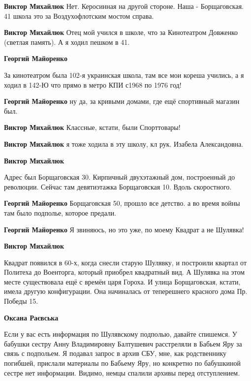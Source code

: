 \begin{itemize}
\begin{itemize}
\begin{itemize}
\textbf{Виктор Михайлюк} Нет. Керосинная на другой стороне. Наша - Борщаговская. 41 школа это за Воздухофлотским мостом справа.

\textbf{Виктор Михайлюк} Отец мой учился в школе, что за Кинотеатром Довженко (светлая память). А я ходил пешком в 41.

\textbf{Георгий Майоренко} 

За кинотеатром была 102-я украинская школа, там все мои кореша учились, а я ходил
в 142-Ю что прямо в метро КПИ с1968 по 1976 год!


\textbf{Георгий Майоренко} ну да, за кривыми домами, где ещё спортивный магазин был.

\textbf{Виктор Михайлюк} Классные, кстати, были Спорттовары!

\textbf{Виктор Михайлюк} я тоже ходила в эту школу, кл рук. Изабела Александовна.
\end{itemize} %

\textbf{Виктор Михайлюк} 

Адрес был Борщаговская 30. Кирпичный двухэтажный дом, построенный до революции.
Сейчас там девятиэтажка Борщаговская 10. Вдоль скоростного.

\begin{itemize} %
\textbf{Георгий Майоренко} Борщаговская 50, прошло все детство. а во время войны там было подполье, которое предали.

\textbf{Георгий Майоренко} Я звиняюсь, но это уже, по моему Квадрат а не Шулявка!

\textbf{Виктор Михайлюк} 

Квадрат появился в 60-х, когда снесли старую Шулявку, и построили квартал от
Политеха до Военторга, который приобрел квадратный вид. А Шулявка на этом месте
существовала ещё с времён царя Гороха. И улица Борщаговская, кстати, имела
другую конфигурации. Она начиналась от теперешнего красного дома Пр. Победы 15.

\textbf{Оксана Раєвська} 

Если у вас есть информация по Шулявскому подполью, давайте спишемся. У бабушки
сестру Анну Владимировну Балтушевич расстреляли в Бабьем Яру за связь с
подпольем. Я подавал запрос в архив СБУ, мне, как родственнику погибшей,
прислали материалы по Бабьему Яру, но конкретно по бабушкиной сестре нет
информации. Видимо, немцы спалили архивы перед отступлением.



\end{itemize}
\end{itemize}
\end{itemize}
